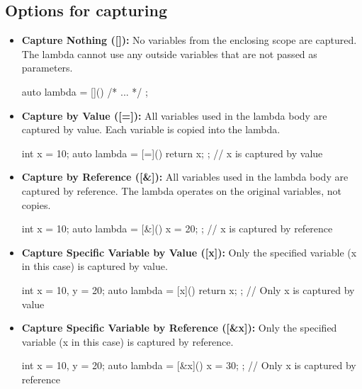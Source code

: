 \documentclass{report}
\begin{document}
    \subsection{Options for capturing}
    \bigbreak \noindent 
    \begin{itemize}
        \item \textbf{Capture Nothing ([]):} No variables from the enclosing scope are captured. The lambda cannot use any outside variables that are not passed as parameters.
            \smallbreak \noindent
            \begin{cppcode}
                auto lambda = []() { /* ... */ };
            \end{cppcode}
        \item \textbf{Capture by Value ([=]):} All variables used in the lambda body are captured by value. Each variable is copied into the lambda.
            \smallbreak \noindent
            \begin{cppcode}
                int x = 10;
                auto lambda = [=]() { return x; }; // x is captured by value
            \end{cppcode}
        \item \textbf{Capture by Reference ([\&]):} All variables used in the lambda body are captured by reference. The lambda operates on the original variables, not copies.
            \smallbreak \noindent
            \begin{cppcode}
                int x = 10;
                auto lambda = [&]() { x = 20; }; // x is captured by reference
            \end{cppcode}
        \item \textbf{Capture Specific Variable by Value ([x]):} Only the specified variable (x in this case) is captured by value.
            \smallbreak \noindent
            \begin{cppcode}
                int x = 10, y = 20;
                auto lambda = [x]() { return x; }; // Only x is captured by value
            \end{cppcode}
        \item \textbf{Capture Specific Variable by Reference ([\&x]):} Only the specified variable (x in this case) is captured by reference.
            \smallbreak \noindent
            \begin{cppcode}
                int x = 10, y = 20;
                auto lambda = [&x]() { x = 30; }; // Only x is captured by reference
            \end{cppcode}

\end{itemize}
\end{document}
